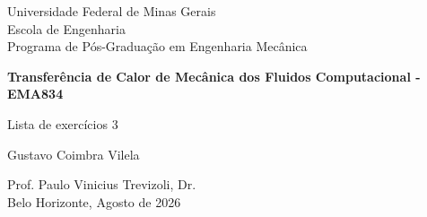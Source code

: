 \begin{titlepage}
\begin{center}
{\large Universidade Federal de Minas Gerais\\
Escola de Engenharia \\
Programa de Pós-Graduação em Engenharia Mecânica\\}

\vspace{6cm}
{\bf\Large Transferência de Calor de Mecânica dos Fluidos Computacional - EMA834\vspace{1.0cm}

Lista de exercícios 3}
\vspace{4cm}

{\large Gustavo Coimbra Vilela}
\vspace{2cm}  
   
\vspace{2cm}          
{\large Prof. Paulo Vinicius Trevizoli, Dr.}\\


\vfill
{\large Belo Horizonte, Agosto de 2026 }
\end{center}

\end{titlepage}